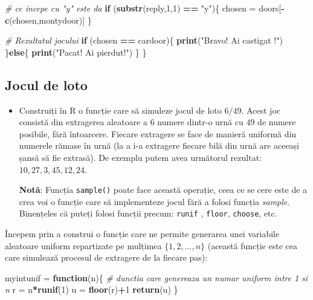 \documentclass[]{article}
\newenvironment{Shaded}{\begin{snugshade}}{\end{snugshade}}
\newcommand{\CommentTok}[1]{\textcolor[rgb]{0.56,0.35,0.01}{\textit{#1}}}
\newcommand{\ControlFlowTok}[1]{\textcolor[rgb]{0.13,0.29,0.53}{\textbf{#1}}}
\newcommand{\DecValTok}[1]{\textcolor[rgb]{0.00,0.00,0.81}{#1}}
\newcommand{\KeywordTok}[1]{\textcolor[rgb]{0.13,0.29,0.53}{\textbf{#1}}}
\newcommand{\NormalTok}[1]{#1}
\newcommand{\OperatorTok}[1]{\textcolor[rgb]{0.81,0.36,0.00}{\textbf{#1}}}
\newcommand{\StringTok}[1]{\textcolor[rgb]{0.31,0.60,0.02}{#1}}
\newenvironment{frshaded*}{%
  \def\FrameCommand{\fboxrule=\FrameRule\fboxsep=\FrameSep \fcolorbox{framecolor}{shadecolor1}}%
  \MakeFramed {\advance\hsize-\width \FrameRestore}}%
{\endMakeFramed}
\newenvironment{rmdblock}[1]
  {\begin{frshaded*}
  \begin{itemize}
  \renewcommand{\labelitemi}{
    \raisebox{-.7\height}[0pt][0pt]{
      {\setkeys{Gin}{width=2em,keepaspectratio}\texttt{[image: images/icons/\#1]}}
    }
  }
  \item
  }
  {
  \end{itemize}
  \end{frshaded*}
  }
\newenvironment{rmdexercise}
  {\begin{rmdblock}{exercise}}
  {\end{rmdblock}}
\begin{document}
\begin{Shaded}
\begin{Highlighting}[]
  \CommentTok{# ce incepe cu "y" este da}
  \ControlFlowTok{if}\NormalTok{ (}\KeywordTok{substr}\NormalTok{(reply,}\DecValTok{1}\NormalTok{,}\DecValTok{1}\NormalTok{) }\OperatorTok{==}\StringTok{ "y"}\NormalTok{)\{}
\NormalTok{    chosen =}\StringTok{ }\NormalTok{doors[}\OperatorTok{-}\KeywordTok{c}\NormalTok{(chosen,montydoor)]}
\NormalTok{  \} }
  
  \CommentTok{# Rezultatul jocului}
  \ControlFlowTok{if}\NormalTok{ (chosen }\OperatorTok{==}\StringTok{ }\NormalTok{cardoor)\{}
    \KeywordTok{print}\NormalTok{(}\StringTok{"Bravo! Ai castigat !"}\NormalTok{)}
\NormalTok{  \}}\ControlFlowTok{else}\NormalTok{\{}
    \KeywordTok{print}\NormalTok{(}\StringTok{"Pacat! Ai pierdut!"}\NormalTok{)}
\NormalTok{  \} }
\NormalTok{\}}
\end{Highlighting}
\end{Shaded}

\hypertarget{jocul-de-loto}{%
\subsection{Jocul de loto}\label{jocul-de-loto}}

\begin{rmdexercise}
Construiți în R o funcție care să simuleze jocul de loto \(6/49\). Acest
joc consistă din extragerea aleatoare a \(6\) numere dintr-o urnă cu
\(49\) de numere posibile, fără întoarcere. Fiecare extragere se face de
manieră uniformă din numerele rămase în urnă (la a i-a extragere fiecare
bilă din urnă are aceeași șansă să fie extrasă). De exemplu putem avea
următorul rezultat: \(10, 27, 3, 45, 12, 24\).

\textbf{Notă}: Funcția \texttt{sample()} poate face această operație,
ceea ce se cere este de a crea voi o funcție care să implementeze jocul
fără a folosi funcția \emph{sample}. Binențeles că puteți folosi funcții
precum: \texttt{runif} , \texttt{floor}, \texttt{choose}, etc.
\end{rmdexercise}

Începem prin a construi o funcție care ne permite generarea unei
variabile aleatoare uniform repartizate pe mulțimea \(\{1,2,\dots,n\}\)
(această funcție este cea care simulează procesul de extragere de la
fiecare pas):

\begin{Shaded}
\begin{Highlighting}[]
\NormalTok{myintunif =}\StringTok{ }\ControlFlowTok{function}\NormalTok{(n)\{}
  \CommentTok{# dunctia care genereaza un numar uniform intre 1 si n}
\NormalTok{  r =}\StringTok{ }\NormalTok{n}\OperatorTok{*}\KeywordTok{runif}\NormalTok{(}\DecValTok{1}\NormalTok{)}
\NormalTok{  u =}\StringTok{ }\KeywordTok{floor}\NormalTok{(r)}\OperatorTok{+}\DecValTok{1}
  \KeywordTok{return}\NormalTok{(u)}
\NormalTok{\}}
\end{Highlighting}
\end{Shaded}
\end{document}
